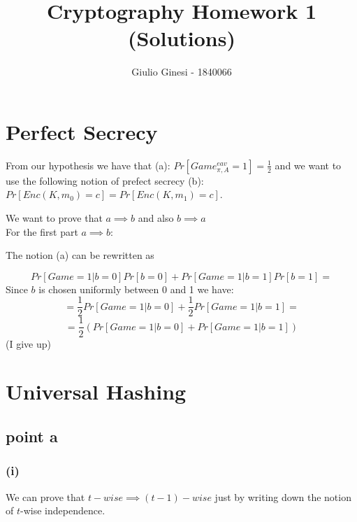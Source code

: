 \documentclass[11pt]{article}
\title{\textbf{Cryptography Homework 1}\\ {\normalsize (Solutions)}}
\author{Giulio Ginesi - 1840066}
\date{}
\newcounter{t0d0_counter}
\begin{document}
\maketitle
\tableofcontents

\section{Perfect Secrecy}
\begin{figure}[h!]
   \centering
   \sdinit{}
\end{figure}


From our hypothesis we have that (a): $Pr[Game_{\pi,A}^{eav}=1]=\frac{1}2$ and we want to use the following notion of prefect secrecy (b): $Pr[Enc(K,m_0)=c]=Pr[Enc(K,m_1)=c] $. 

We want to prove that $a \implies b$ and also $ b \implies a $
\\
For the first part $a \implies b$:

The notion (a) can be rewritten as 

$$ Pr[Game=1 | b=0]Pr[b=0]+Pr[Game=1 | b=1]Pr[b=1]=$$
Since $b$ is chosen uniformly between 0 and 1 we have:
$$=\frac{1}{2}Pr[Game=1 | b=0]+\frac{1}{2}Pr[Game=1 | b=1]=$$
$$=\frac{1}{2}(Pr[Game=1 | b=0]+Pr[Game=1 | b=1])$$
(I give up)

\section{Universal Hashing}
 \subsection{point a}
 \subsubsection{(i)}
 We can prove that $t-wise \implies (t-1)-wise$ just by writing down the notion of $t$-wise independence.
\end{document}
